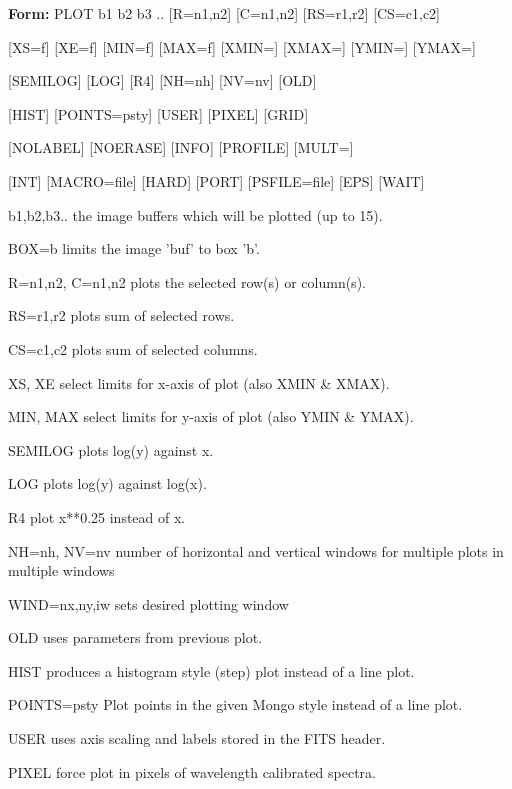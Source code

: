 {\newpage\clearpage
{}%
\begin{command}
  \item[\textbf{Form: } PLOT b1 b2 b3 .. {[R=n1,n2]} {[C=n1,n2]}
       {[RS=r1,r2]} {[CS=c1,c2]}\hfill]{}
  \item{{[XS=f]} {[XE=f]} {[MIN=f]} {[MAX=f]} {[XMIN=]} {[XMAX=]} 
        {[YMIN=]} {[YMAX=]}}
  \item{{[SEMILOG]} {[LOG]} {[R4]} {[NH=nh]} {[NV=nv]} {[OLD]}}
  \item{{[HIST]} {[POINTS=psty]} {[USER]} {[PIXEL]} {[GRID]} }
  \item{{[NOLABEL]} {[NOERASE]} {[INFO]} {[PROFILE]} {[MULT=]} }
  \item{{[INT]} {[MACRO=file]} {[HARD]} {[PORT]} {[PSFILE=file]} {[EPS]} 
       {[WAIT]} }
  \item[b1,b2,b3..]{the image buffers which will be plotted (up to 15).}
  \item[BOX=b]{limits the image 'buf' to box 'b'.}
  \item[R=n1,n2, C=n1,n2]{plots the selected row(s) or column(s).}
  \item[RS=r1,r2]{plots sum of selected rows.}
  \item[CS=c1,c2]{plots sum of selected columns.}
  \item[XS, XE]{select limits for x-axis of plot (also XMIN \& XMAX).}
  \item[MIN, MAX]{select limits for y-axis of plot (also YMIN \& YMAX).}
  \item[SEMILOG]{plots log(y) against x.}
  \item[LOG]{plots log(y) against log(x).}
  \item[R4      ]{plot x**0.25 instead of x.}
  \item[NH=nh, NV=nv ]{number of horizontal and vertical windows
       for multiple plots in multiple windows}
  \item[WIND=nx,ny,iw]{sets desired plotting window}
  \item[OLD]{uses parameters from previous plot.}
  \item[HIST]{produces a histogram style (step) plot instead of a line plot.}
  \item[POINTS=psty]{Plot points in the given Mongo style instead of a line
                     plot.}
  \item[USER]{uses axis scaling and labels stored in the FITS header.}
  \item[PIXEL]{force plot in pixels of wavelength calibrated spectra.}

\end{command}}
